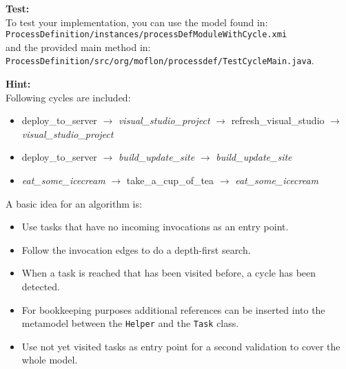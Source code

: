 \textbf{Test:} \\To test your implementation, you can use the model found in:\\
\noindent\hspace*{10mm}\texttt{ProcessDefinition\slash instances\slash processDefModuleWithCycle.xmi}\\
and the provided main method in:\\
\noindent\hspace*{10mm}\texttt{ProcessDefinition\slash src\slash org\slash moflon\slash processdef\slash TestCycleMain.java}.


\textbf{Hint:} \\
Following cycles are included:
\begin{itemize}
  \item deploy\_to\_server $\rightarrow$ \textit{visual\_studio\_project} $\rightarrow$ refresh\_visual\_studio $\rightarrow$ \textit{visual\_studio\_project}
  \item deploy\_to\_server $\rightarrow$ \textit{build\_update\_site} $\rightarrow$ \textit{build\_update\_site}
  \item \textit{eat\_some\_icecream} $\rightarrow$ take\_a\_cup\_of\_tea $\rightarrow$ \textit{eat\_some\_icecream}
\end{itemize}

A basic idea for an algorithm is:
\begin{itemize}
  \item Use tasks that have no incoming invocations as an entry point.
  \item Follow the invocation edges to do a depth-first search.
  \item When a task is reached that has been visited before, a cycle has been detected.
  \item For bookkeeping purposes additional references can be inserted into the metamodel between the \texttt{Helper} and the \texttt{Task} class.
  \item Use not yet visited tasks as entry point for a second validation to cover the whole model.    
\end{itemize}


